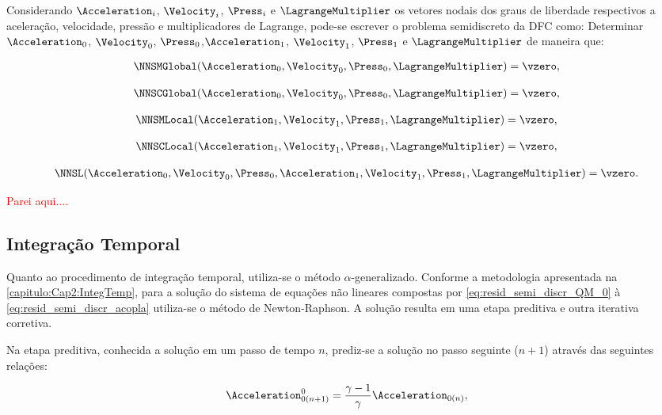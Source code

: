Considerando $\Acceleration_i$, $\Velocity_i$, $\Press_i$ e $\LagrangeMultiplier$ os vetores nodais dos graus de liberdade respectivos a aceleração, velocidade, pressão e multiplicadores de Lagrange, pode-se escrever o problema semidiscreto da DFC como: Determinar $\Acceleration_0$, $\Velocity_0$, $\Press_0$,$\Acceleration_1$, $\Velocity_1$, $\Press_1$ e $\LagrangeMultiplier$ de maneira que:

\begin{align}
	\NNSMGlobal(\Acceleration_0,\Velocity_0,\Press_0,\LagrangeMultiplier) = \vzero, \label{eq:resid_semi_discr_QM_0}
\end{align}

\begin{align}
	\NNSCGlobal(\Acceleration_0,\Velocity_0,\Press_0,\LagrangeMultiplier) = \vzero, 
\end{align}

\begin{align}
	\NNSMLocal(\Acceleration_1,\Velocity_1,\Press_1,\LagrangeMultiplier) = \vzero,
\end{align}

\begin{align}
	\NNSCLocal(\Acceleration_1,\Velocity_1,\Press_1,\LagrangeMultiplier) = \vzero,
\end{align}

\begin{align}
	\NNSL(\Acceleration_0,\Velocity_0,\Press_0,\Acceleration_1,\Velocity_1,\Press_1,\LagrangeMultiplier) = \vzero. \label{eq:resid_semi_discr_acopla}
\end{align}


\textcolor{red}{Parei aqui....}
\subsection{Integração Temporal}

Quanto ao procedimento de integração temporal, utiliza-se o método $\alpha$-generalizado. Conforme a metodologia apresentada na \autoref{capitulo:Cap2:IntegTemp}, para a solução do sistema de equações não lineares compostas por \autoref{eq:resid_semi_discr_QM_0} à \autoref{eq:resid_semi_discr_acopla} utiliza-se o método de Newton-Raphson. A solução resulta em uma etapa preditiva e outra iterativa corretiva.

Na etapa preditiva, conhecida a solução em um passo de tempo $n$, prediz-se a solução no passo seguinte ($n+1$) através das seguintes relações:

\begin{align}
	\Acceleration_{0(n+1)}^{0} = \frac{\gamma-1}{\gamma}\Acceleration_{0(n)} \label{eq:pred_acel_0},
\end{align}

